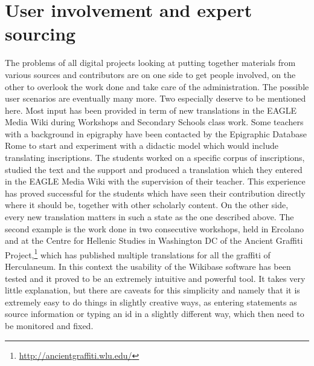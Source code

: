 \documentclass[amsthm,ebook]{saparticle}
\begin{document}
\section{User involvement and expert sourcing}
\noindent The problems of all digital projects looking at putting together materials from various sources and contributors are on one side to get people involved, on the other to overlook the work done and take care of the administration.  
The possible user scenarios are eventually many more. Two especially deserve to be mentioned here. Most input has been provided in term of new translations in the EAGLE Media Wiki during Workshops and Secondary Schools class work. Some teachers with a background in epigraphy have been contacted by the Epigraphic Database Rome to start and experiment with a didactic model which would include translating inscriptions. The students worked on a specific corpus of inscriptions, studied the text and the support and produced a translation which they entered in the EAGLE Media Wiki with the supervision of their teacher. This experience has proved successful for the students which have seen their contribution directly where it should be, together with other scholarly content. On the other side, every new translation matters in such a state as the one described above. 
The second example is the work done in two consecutive workshops, held in Ercolano and at the Centre for Hellenic Studies in Washington DC of the Ancient Graffiti Project,\footnote{\url{http://ancientgraffiti.wlu.edu/}} which has published multiple translations for all the graffiti of Herculaneum. In this context the usability of the Wikibase software has been tested and it proved to be an extremely intuitive and powerful tool. It takes very little explanation, but there are caveats for this simplicity and namely that it is extremely easy to do things in slightly creative ways, as entering statements as source information or typing an id in a slightly different way, which then need to be monitored and fixed.
\end{document}
